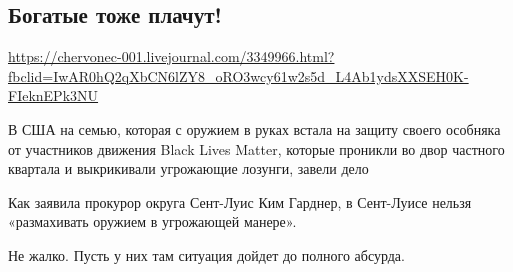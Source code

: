  
 
\def\sectitle{Богатые тоже плачут!}
\subsection{\sectitle}
\label{sec:21_07_2020.lj.chervonec_001.1}
\url{https://chervonec-001.livejournal.com/3349966.html?fbclid=IwAR0hQ2qXbCN6lZY8_oRO3wcy61w2s5d_L4Ab1ydsXXSEH0K-FIeknEPk3NU}

В США на семью, которая с оружием в руках встала на защиту своего особняка от
участников движения Black Lives Matter, которые проникли во двор частного
квартала и выкрикивали угрожающие лозунги, завели дело

Как заявила прокурор округа Сент-Луис Ким Гарднер, в Сент-Луисе нельзя
«размахивать оружием в угрожающей манере».

Не жалко. Пусть у них там ситуация дойдет до полного абсурда.

  
